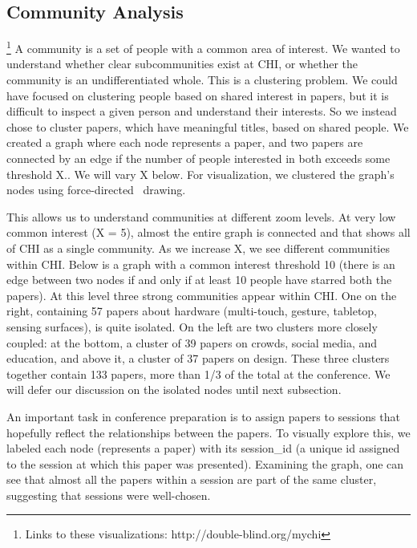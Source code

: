 \documentclass{sigchi}
\begin{document}
\subsection{Community Analysis}
\footnote[1]{Links to these visualizations: http://double-blind.org/mychi}
A community is a set of people with a common area of interest. We wanted to understand whether clear subcommunities exist at CHI, or whether the community is an undifferentiated whole.  This is a clustering problem. We could have focused on clustering people based on shared interest in papers, but it is difficult to inspect a given person and understand their interests.  So we instead chose to cluster papers, which have meaningful titles, based on shared people.  We created a graph where each node represents a paper, and two papers are connected by an edge if the number of people interested in both exceeds some threshold X..  We will vary X below.   For visualization, we clustered the graph's nodes using force-directed~\cite{Eades00navigatingclustered} drawing.

This allows us to understand communities at different zoom levels. At very low common interest (X = 5), almost the entire graph is connected and that shows all of CHI as a single community. As we increase X, we see different communities within CHI. Below is a graph with a common interest threshold 10 (there is an edge between two nodes if and only if at least 10 people have starred both the papers). At this level three strong communities appear within CHI.  One on the right, containing 57 papers about hardware (multi-touch, gesture, tabletop, sensing surfaces), is quite isolated.  On the left are two clusters more closely coupled: at the bottom, a cluster of 39 papers on crowds, social media, and education, and above it, a cluster of 37 papers on design.  These three clusters together contain 133 papers, more than 1/3 of the total at the conference.  We will defer our discussion on the isolated nodes until next subsection.


An important task in conference preparation is to assign papers to sessions that hopefully reflect the relationships between the papers.  To visually explore this, we labeled each node (represents a paper) with its session\_id (a unique id assigned to the session at which this paper was presented).  Examining the graph, one can see that almost all the papers within a session are part of the same cluster, suggesting that sessions were well-chosen. 
\end{document}
